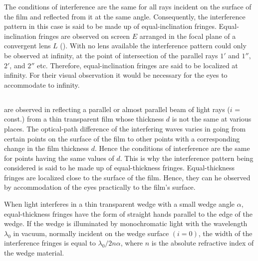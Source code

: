 The conditions of interference are the same for all rays incident on the surface of the film and reflected from it at the same angle. Consequently, the interference pattern in this case is said to be made up of equal-inclination fringes.
Equal-inclination fringes are observed on screen $E$ arranged in the focal plane of a convergent lens $L$ (). With no lens available the interference pattern could only be observed at infinity, at the point of intersection of the parallel rays $\mathit{1}'$ and $\mathit{1}''$, $\mathit{2}'$,  and $\mathit{2}''$ etc. Therefore, equal-inclination fringes are said to be localized at infinity. For their visual observation it would be necessary for the eyes to accommodate to infinity.

\subsection{}\label{32.3.6}  are observed in reflecting a parallel or almost parallel beam of light rays ($i$ = const.) from a thin transparent film whose thickness $d$ is not the same at various places. The optical-path difference of the interfering waves varies in going from certain points on the surface of the film to other points with a corresponding change in the film thickness $d$. Hence the conditions of interference are the same for points having
the same values of $d$. This is why the interference pattern being considered is said to he made up of equal-thickness fringes. Equal-thickness fringes are localized close to the surface of the film. Hence, they can he observed
by accommodation of the eyes practically
to the film's surface.

When light interferes in a thin transparent wedge with a small wedge angle $\alpha$, equal-thickness fringes have the form of straight hands parallel to the edge of the wedge. If the wedge
is illuminated by monochromatic light with the wavelength $\lambda_{0}$ in vacuum, normally incident on the wedge surface
$(i = 0)$, the width of the interference fringes  is equal to $\lambda_{0}/2n\alpha$, where $n$ is the absolute refractive index of the wedge material.

